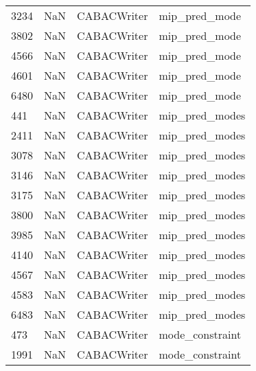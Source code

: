 \begin{tabular}{llll}
3234 &                   NaN &                CABACWriter &                             mip\_pred\_mode \\
3802 &                   NaN &                CABACWriter &                             mip\_pred\_mode \\
4566 &                   NaN &                CABACWriter &                             mip\_pred\_mode \\
4601 &                   NaN &                CABACWriter &                             mip\_pred\_mode \\
6480 &                   NaN &                CABACWriter &                             mip\_pred\_mode \\
441  &                   NaN &                CABACWriter &                            mip\_pred\_modes \\
2411 &                   NaN &                CABACWriter &                            mip\_pred\_modes \\
3078 &                   NaN &                CABACWriter &                            mip\_pred\_modes \\
3146 &                   NaN &                CABACWriter &                            mip\_pred\_modes \\
3175 &                   NaN &                CABACWriter &                            mip\_pred\_modes \\
3800 &                   NaN &                CABACWriter &                            mip\_pred\_modes \\
3985 &                   NaN &                CABACWriter &                            mip\_pred\_modes \\
4140 &                   NaN &                CABACWriter &                            mip\_pred\_modes \\
4567 &                   NaN &                CABACWriter &                            mip\_pred\_modes \\
4583 &                   NaN &                CABACWriter &                            mip\_pred\_modes \\
6483 &                   NaN &                CABACWriter &                            mip\_pred\_modes \\
473  &                   NaN &                CABACWriter &                           mode\_constraint \\
1991 &                   NaN &                CABACWriter &                           mode\_constraint \\

\end{tabular}

